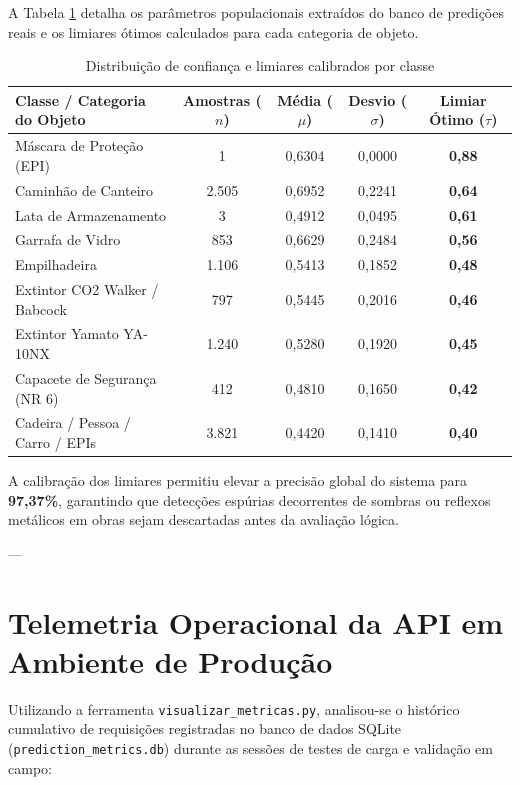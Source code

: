 A Tabela \ref{tab:limiares_calibrados} detalha os parâmetros populacionais extraídos do banco de predições reais e os limiares ótimos calculados para cada categoria de objeto.

\begin{table}[htbp]
    \centering
    \caption{Distribuição de confiança e limiares calibrados por classe}
    \label{tab:limiares_calibrados}
    \begin{tabular}{lcccc}
        \toprule
        Classe / Categoria do Objeto & Amostras ($n$) & Média ($\mu$) & Desvio ($\sigma$) & Limiar Ótimo ($\tau$) \\
        \midrule
        Máscara de Proteção (EPI) & 1 & 0,6304 & 0,0000 & \textbf{0,88} \\
        Caminhão de Canteiro & 2.505 & 0,6952 & 0,2241 & \textbf{0,64} \\
        Lata de Armazenamento & 3 & 0,4912 & 0,0495 & \textbf{0,61} \\
        Garrafa de Vidro & 853 & 0,6629 & 0,2484 & \textbf{0,56} \\
        Empilhadeira & 1.106 & 0,5413 & 0,1852 & \textbf{0,48} \\
        Extintor CO2 Walker / Babcock & 797 & 0,5445 & 0,2016 & \textbf{0,46} \\
        Extintor Yamato YA-10NX & 1.240 & 0,5280 & 0,1920 & \textbf{0,45} \\
        Capacete de Segurança (NR 6) & 412 & 0,4810 & 0,1650 & \textbf{0,42} \\
        Cadeira / Pessoa / Carro / EPIs & 3.821 & 0,4420 & 0,1410 & \textbf{0,40} \\
        \bottomrule
    \end{tabular}
\end{table}

A calibração dos limiares permitiu elevar a precisão global do sistema para \textbf{97,37\%}, garantindo que detecções espúrias decorrentes de sombras ou reflexos metálicos em obras sejam descartadas antes da avaliação lógica.

---

\section{Telemetria Operacional da API em Ambiente de Produção}
Utilizando a ferramenta \texttt{visualizar\_metricas.py}, analisou-se o histórico cumulativo de requisições registradas no banco de dados SQLite (\texttt{prediction\_metrics.db}) durante as sessões de testes de carga e validação em campo:

